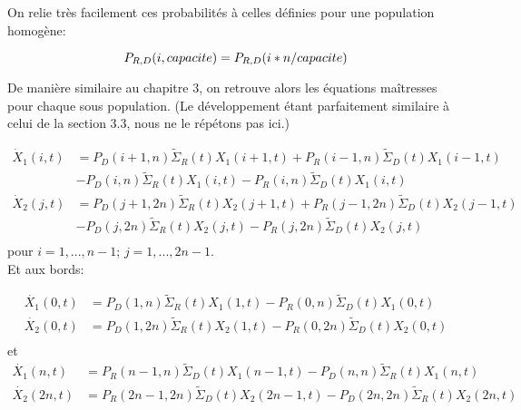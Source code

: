 On relie très facilement ces  probabilités à celles définies pour une population homogène:

\begin{equation}
P_{R,D}(i,capacite)=P_{R,D}(i*n/capacite)\\
\label{loi_capacite}
\end{equation}



De manière similaire au chapitre 3, on retrouve alors les équations maîtresses pour chaque sous population. (Le développement étant parfaitement similaire à celui de la section 3.3, nous ne le répétons pas ici.)



\begin{equation}
\begin{aligned}
\dot{X}_1(i,t) &= P_D(i+1,n) \tilde{\Sigma}_R(t) X_1(i+1,t) + P_R(i-1,n) \tilde{\Sigma}_D(t) X_1(i-1,t)\\
					&-P_D(i,n) \tilde{\Sigma}_R(t) X_1(i,t) -P_R(i,n) \tilde{\Sigma}_D(t) X_1(i,t)\\
\dot{X}_2(j,t) &= P_D(j+1,2n) \tilde{\Sigma}_R(t) X_2(j+1,t) + P_R(j-1,2n) \tilde{\Sigma}_D(t) X_2(j-1,t)\\
					&-P_D(j,2n) \tilde{\Sigma}_R(t) X_2(j,t) -P_R(j,2n) \tilde{\Sigma}_D(t) X_2(j,t)\\		
\label{maitressebis}
\end{aligned}
\end{equation}
pour $i = 1,...,n-1$; $j=1,...,2n-1$.\\

Et aux bords:

\begin{equation}
\begin{aligned}
\dot{X_1}(0,t)&= P_D(1,n) \tilde{\Sigma}_R(t) X_1(1,t) - P_R(0,n) \tilde{\Sigma}_D(t) X_1(0,t)\\
\dot{X_2}(0,t)&= P_D(1,2n) \tilde{\Sigma}_R(t) X_2(1,t) - P_R(0,2n) \tilde{\Sigma}_D(t) X_2(0,t)\\
\label{bord0bis}
\end{aligned}
\end{equation}
 et 
\begin{equation}
\begin{aligned}
\dot{X_1}(n,t)&= P_R(n-1,n) \tilde{\Sigma}_D(t) X_1(n-1,t)- P_D(n,n) \tilde{\Sigma}_R(t) X_1(n,t)\\
\dot{X_2}(2n,t)&= P_R(2n-1,2n) \tilde{\Sigma}_D(t) X_2(2n-1,t)- P_D(2n,2n) \tilde{\Sigma}_R(t) X_2(2n,t)\\
\label{bordNbis}
\end{aligned}
\end{equation}

